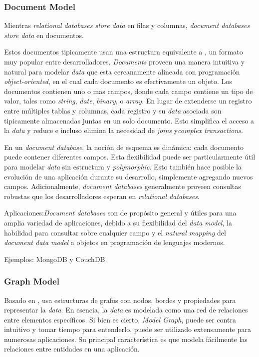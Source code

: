 \subsubsection{Document Model}\label{cap:justificacion_proyecto:tecnologias:nosql:document_model}
 Mientras \textit{relational databases store data} en filas y columnas, \textit{document databases store data} en documentos.  

Estos documentos tipicamente usan una estructura equivalente a , un formato muy popular entre desarrolladores. \textit{Documents} proveen una manera intuitiva y natural para modelar \textit{data} que esta cercanamente alineada con  programación \textit{object-oriented}, en el cual cada documento es efectivamente un objeto. Los documentos contienen uno o mas campos, donde cada campo contiene un tipo de valor, tales como \textit{string}, \textit{date}, \textit{binary}, o \textit{array}. En lugar de extenderse un registro entre múltiples tablas y columnas, cada registro y su \textit{data} asociada son tipicamente almacenadas juntas en un solo documento. Esto simplifica el acceso a la \textit{data} y reduce e incluso elimina la necesidad de \textit{joins} y\textit{complex transactions}.

En un \textit{document database}, la noción de esquema es dinámica: cada documento puede contener diferentes campos. Esta flexibilidad puede ser particularmente útil para modelar \textit{data} sin estructura y \textit{polymorphic}. Esto también hace posible la evolución de una aplicación durante su desarrollo, simplemente agregando nuevos campos. Adicionalmente, \textit{document databases} generalmente proveen consultas robustas que los desarrolladores esperan en \textit{relational databases}.

Aplicaciones:\textit{Document databases} son de propósito general y útiles para una amplia variedad de aplicaciones, debido a su flexibilidad del \textit{data model}, la habilidad para consultar sobre cualquier campo y el \textit{natural mapping} del \textit{document data model} a objetos en programación de lenguajes modernos.

Ejemplos: MongoDB y CouchDB.

\subsubsection{Graph Model}

Basado en , usa estructuras de grafos con nodos, bordes y propiedades para representar la \textit{data}. En esencia, la \textit{data} es modelada como una red de relaciones entre elementos específicos. Si bien es cierto, \textit{Model Graph}, puede ser contra intuitivo y tomar tiempo para entenderlo, puede ser utilizado extensamente para numerosas aplicaciones. Su principal característica es que modela fácilmente las relaciones entre entidades en una aplicación.

